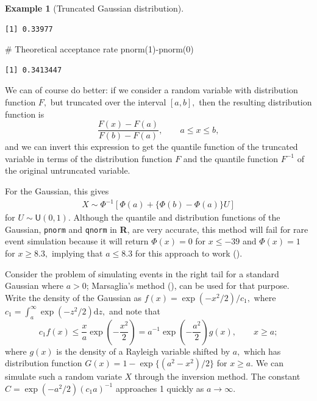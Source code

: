 \documentclass[
  11pt,
  letterpaper,
]{scrbook}
\newenvironment{Shaded}{\begin{snugshade}}{\end{snugshade}}
\newcommand{\CommentTok}[1]{\textcolor[rgb]{0.37,0.37,0.37}{#1}}
\newcommand{\DecValTok}[1]{\textcolor[rgb]{0.68,0.00,0.00}{#1}}
\newcommand{\FunctionTok}[1]{\textcolor[rgb]{0.28,0.35,0.67}{#1}}
\newcommand{\NormalTok}[1]{\textcolor[rgb]{0.00,0.23,0.31}{#1}}
\newcommand{\SpecialCharTok}[1]{\textcolor[rgb]{0.37,0.37,0.37}{#1}}
\theoremstyle{definition}
\theoremstyle{plain}
\theoremstyle{plain}
\theoremstyle{definition}
\theoremstyle{definition}
\newtheorem{example}{Example}[chapter]
\theoremstyle{remark}
\begin{document}
\begin{example}[Truncated Gaussian
distribution]
\begin{verbatim}
[1] 0.33977
\end{verbatim}

\begin{Shaded}
\begin{Highlighting}[]
\CommentTok{\# Theoretical acceptance rate}
\FunctionTok{pnorm}\NormalTok{(}\DecValTok{1}\NormalTok{)}\SpecialCharTok{{-}}\FunctionTok{pnorm}\NormalTok{(}\DecValTok{0}\NormalTok{)}
\end{Highlighting}
\end{Shaded}

\begin{verbatim}
[1] 0.3413447
\end{verbatim}

We can of course do better: if we consider a random variable with
distribution function \(F,\) but truncated over the interval \([a,b],\)
then the resulting distribution function is
\[\frac{F(x) - F(a)}{F(b)-F(a)}, \qquad a \leq x \leq b,\] and we can
invert this expression to get the quantile function of the truncated
variable in terms of the distribution function \(F\) and the quantile
function \(F^{-1}\) of the original untruncated variable.

For the Gaussian, this gives \begin{align*}
X \sim \Phi^{-1}\left[\Phi(a) + \{\Phi(b)-\Phi(a)\}U\right]
\end{align*} for \(U \sim \mathsf{U}(0,1).\) Although the quantile and
distribution functions of the Gaussian, \texttt{pnorm} and
\texttt{qnorm} in \textbf{R}, are very accurate, this method will fail
for rare event simulation because it will return \(\Phi(x) = 0\) for
\(x \leq -39\) and \(\Phi(x)=1\) for \(x \geq 8.3,\) implying that
\(a \leq 8.3\) for this approach to work
().

Consider the problem of simulating events in the right tail for a
standard Gaussian where \(a > 0\); Marsaglia's method
(), can be used for that
purpose. Write the density of the Gaussian as
\(f(x) = \exp(-x^2/2)/c_1,\) where
\(c_1 = \int_{a}^{\infty}\exp(-z^2/2)\mathrm{d} z,\) and note that
\[c_1f(x) \leq \frac{x}{a}\exp\left(-\frac{x^2}{2}\right)= a^{-1}\exp\left(-\frac{a^2}{2}\right)g(x), \qquad x \geq a;\]
where \(g(x)\) is the density of a Rayleigh variable shifted by \(a,\)
which has distribution function \(G(x) = 1-\exp\{(a^2-x^2)/2\}\) for
\(x \geq a.\) We can simulate such a random variate \(X\) through the
inversion method. The constant \(C= \exp(-a^2/2)(c_1a)^{-1}\) approaches
1 quickly as \(a \to \infty.\)


\end{example}
\end{document}
